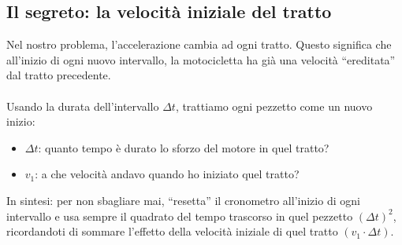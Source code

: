 \documentclass[a4paper,11pt]{article}
\begin{document}
\subsection{Il segreto: la velocità iniziale del tratto}

Nel nostro problema, l'accelerazione cambia ad ogni tratto.
Questo significa che all'inizio di ogni nuovo intervallo, la motocicletta ha già una velocità ``ereditata'' dal tratto precedente.\\
\\
Usando la durata dell'intervallo $\Delta t$, trattiamo ogni pezzetto come un nuovo inizio:
\begin{itemize}
\item $\Delta t$: quanto tempo è durato lo sforzo del motore in quel tratto?
\item $v_1$: a che velocità andavo quando ho iniziato quel tratto?
\end{itemize}

In sintesi: per non sbagliare mai, ``resetta'' il cronometro all'inizio di ogni intervallo e usa sempre il quadrato del tempo trascorso in quel pezzetto $(\Delta t)^2$, ricordandoti di sommare l'effetto della velocità iniziale di quel tratto $(v_1 \cdot \Delta t)$.
\end{document}
